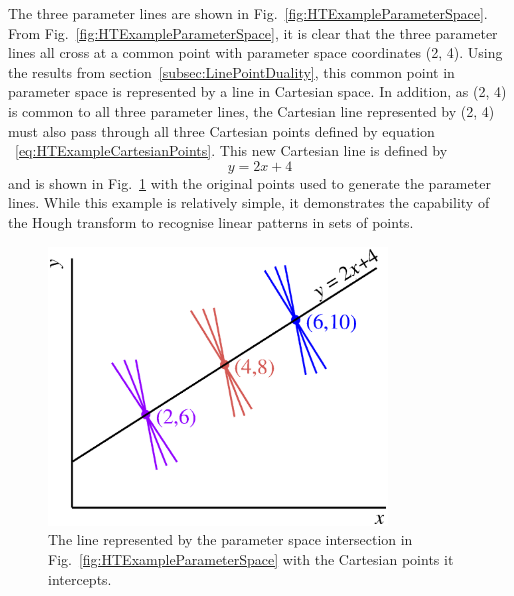 The three parameter lines are shown in Fig.~\ref{fig:HTExampleParameterSpace}.  From Fig.~\ref{fig:HTExampleParameterSpace}, it is clear that the three parameter lines all cross at a common point with parameter space coordinates (2, 4).  Using the results from section~\ref{subsec:LinePointDuality}, this common point in parameter space is represented by a line in Cartesian space.  In addition, as (2, 4) is common to all three parameter lines, the Cartesian line represented by (2, 4) must also pass through all three Cartesian points defined by equation ~\ref{eq:HTExampleCartesianPoints}.  This new Cartesian line is defined by
\begin{equation}
  y = 2x + 4
  \label{eq:HTExampleCartesianLine}
\end{equation}
and is shown in Fig.~\ref{fig:HTExampleCartesianSpaceWithLine} with the original points used to generate the parameter lines.  While this example is relatively simple, it demonstrates the capability of the Hough transform to recognise linear patterns in sets of points.

\begin{figure}
  \centering
  \includegraphics[width=9cm]{images/hough_transform/HT_example_cartesian_space_with_line}
  \caption{The line represented by the parameter space intersection in Fig.~\ref{fig:HTExampleParameterSpace} with the Cartesian points it intercepts.}
  \label{fig:HTExampleCartesianSpaceWithLine}
\end{figure}

